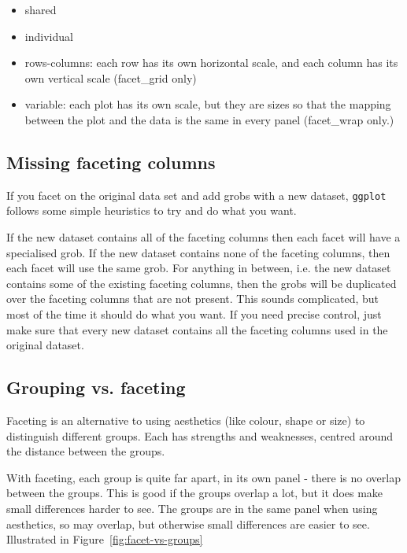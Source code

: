 \begin{itemize}
  \item shared
  \item individual
  \item rows-columns: each row has its own horizontal scale, and each column has its own vertical scale (facet\_grid only)
  \item variable: each plot has its own scale, but they are sizes so that the mapping between the plot and the data is the same in every panel (facet\_wrap only.)
\end{itemize}



\subsection{Missing faceting columns}\label{sub:missing_faceting_columns}

If you facet on the original data set and add grobs with a new dataset, {\tt ggplot} follows some simple heuristics to try and do what you want.  

If the new dataset contains all of the faceting columns then each facet will have a specialised grob. If the new dataset contains none of the faceting columns, then each facet will use the same grob.  For anything in between, i.e. the new dataset contains some of the existing faceting columns, then the grobs will be duplicated over the faceting columns that are not present.  This sounds complicated, but most of the time it should do what you want.  If you need precise control, just make sure that every new dataset contains all the faceting columns used in the original dataset.



\subsection{Grouping vs. faceting}
\label{sub:group-vs-facet}

Faceting is an alternative to using aesthetics (like colour, shape or size) to distinguish different groups.  Each has strengths and weaknesses, centred around the distance between the groups.

With faceting, each group is quite far apart, in its own panel - there is no overlap between the groups.  This is good if the groups overlap a lot, but it does make small differences harder to see.  The groups are in the same panel when using aesthetics, so may overlap, but otherwise small differences are easier to see.  Illustrated in Figure~\ref{fig:facet-vs-groups}

